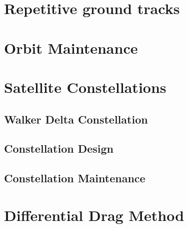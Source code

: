 \section{Repetitive ground tracks}


\section{Orbit Maintenance}


\section{Satellite Constellations}
\subsection{Walker Delta Constellation}
\subsection{Constellation Design}
\subsection{Constellation Maintenance}


\section{Differential Drag Method}



